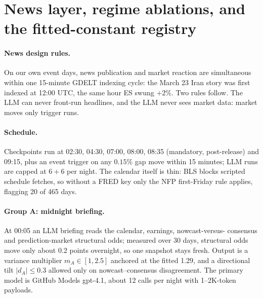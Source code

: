 \section{News layer, regime ablations, and the fitted-constant registry}
\label{app:news}

\paragraph{News design rules.}
On our own event days, news publication and market reaction are
simultaneous within one 15-minute GDELT indexing cycle: the March 23 Iran
story was first indexed at 12:00 UTC, the same hour ES swung $+2\%$. Two
rules follow. The LLM can never front-run headlines, and the LLM never
sees market data: market moves only trigger runs.

\paragraph{Schedule.}
Checkpoints run at 02:30, 04:30, 07:00, 08:00, 08:35 (mandatory,
post-release) and 09:15, plus an event trigger on any $0.15\%$ gap move
within 15 minutes; LLM runs are capped at $6+6$ per night. The calendar
itself is thin: BLS blocks scripted schedule fetches, so without a FRED
key only the NFP first-Friday rule applies, flagging 20 of 465 days.

\paragraph{Group A: midnight briefing.}
At 00:05 an LLM briefing reads the calendar, earnings, nowcast-versus-
consensus and prediction-market structural odds; measured over 30 days,
structural odds move only about 0.2 points overnight, so one snapshot
stays fresh. Output is a variance multiplier $m_A \in [1, 2.5]$ anchored
at the fitted 1.29, and a directional tilt $\lvert d_A \rvert \le 0.3$
allowed only on nowcast--consensus disagreement. The primary model is
GitHub Models gpt-4.1, about 12 calls per night with 1--2K-token payloads.

